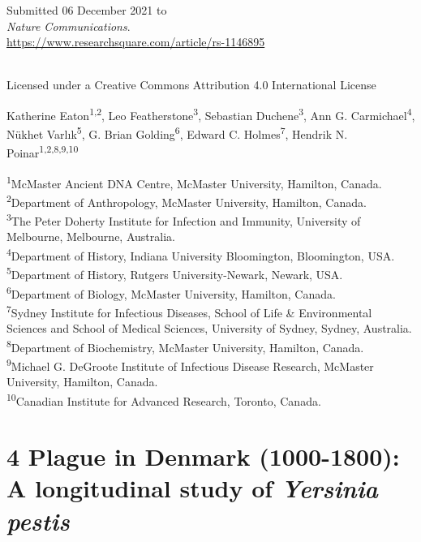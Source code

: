 \documentclass[
]{report}
\begin{document}
\setlength{\parindent}{0em}

Submitted 06 December 2021 to\\
\emph{Nature Communications}.\\
\url{https://www.researchsquare.com/article/rs-1146895}\strut \\
Licensed under a Creative Commons Attribution 4.0 International
License\\
\hspace*{0.333em}

Katherine Eaton\textsuperscript{1,2}, Leo
Featherstone\textsuperscript{3}, Sebastian Duchene\textsuperscript{3},
Ann G. Carmichael\textsuperscript{4}, Nükhet Varlık\textsuperscript{5},
G. Brian Golding\textsuperscript{6}, Edward C.
Holmes\textsuperscript{7}, Hendrik N.
Poinar\textsuperscript{1,2,8,9,10}\\
\hspace*{0.333em}

\textsuperscript{1}McMaster Ancient DNA Centre, McMaster University,
Hamilton, Canada.\\
\textsuperscript{2}Department of Anthropology, McMaster University,
Hamilton, Canada.\\
\textsuperscript{3}The Peter Doherty Institute for Infection and
Immunity, University of Melbourne, Melbourne, Australia.\\
\textsuperscript{4}Department of History, Indiana University
Bloomington, Bloomington, USA.\\
\textsuperscript{5}Department of History, Rutgers University-Newark,
Newark, USA.\\
\textsuperscript{6}Department of Biology, McMaster University, Hamilton,
Canada.\\
\textsuperscript{7}Sydney Institute for Infectious Diseases, School of
Life \& Environmental Sciences and School of Medical Sciences,
University of Sydney, Sydney, Australia.\\
\textsuperscript{8}Department of Biochemistry, McMaster University,
Hamilton, Canada.\\
\textsuperscript{9}Michael G. DeGroote Institute of Infectious Disease
Research, McMaster University, Hamilton, Canada.\\
\textsuperscript{10}Canadian Institute for Advanced Research, Toronto,
Canada.\\

\setlength{\parindent}{2em}

\hypertarget{plague-in-denmark-1000-1800-a-longitudinal-study-of-yersinia-pestis}{%
\chapter{\texorpdfstring{4 Plague in Denmark (1000-1800): A longitudinal
study of \emph{Yersinia
pestis}}{4 Plague in Denmark (1000-1800): A longitudinal study of Yersinia pestis}}\label{plague-in-denmark-1000-1800-a-longitudinal-study-of-yersinia-pestis}}
\end{document}
